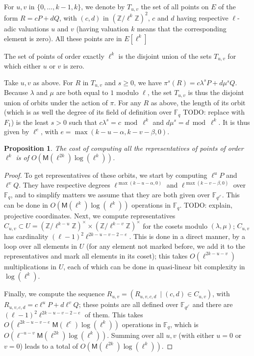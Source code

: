 \documentclass{lms}
\newcommand{\todo}[1]{{\color{red}TODO: #1}}
\newtheorem{prop}[thm]{Proposition}
\newcommand{\M}{\mathsf{M}}
\newcommand{\Z}{\mathbb{Z}}
\newcommand{\F}{\mathbb{F}}
\begin{document}
\begin{defi}
For $u,v$ in $\{0,\dots,k-1,k\}$, we denote by $T_{u,v}$ the set
of all points on $E$ of the form $R=c P + d Q$, with $(c,d)$ in
$(\Z/\ell^k\Z)^2$, $c$ and $d$ having respective $\ell$-adic
valuations $u$ and $v$ (having valuation $k$ means that the
corresponding element is zero). All these points are in $E[\ell^k]$
\end{defi}

The set of points of order exactly $\ell^k$ is the disjoint union of
the sets $T_{u,v}$ for which either $u$ or $v$ is zero.

Take $u,v$ as above. For $R$ in $T_{u,v}$ and $s \ge 0$, we have
$\pi^s(R) = c\lambda^s P+ d \mu^s Q$.  Because $\lambda$ and $\mu$ are
both equal to $1$ modulo $\ell$, the set $T_{u,v}$ is thus the
disjoint union of orbits under the action of $\pi$. For any $R$ as
above, the length of its orbit (which is as well the degree of its
field of definition over $\F_q$ \todo{replace with $F_1$}) is the least $s>0$ such that $c
\lambda^s = c \bmod \ell^k$ and $d \mu^s =d \bmod \ell^k$. It is thus
given by $\ell^e$, with $e={\max(k-u-\alpha, k-v-\beta, 0)}$. %

\begin{prop} \label{prop:cout-repre}
The cost of computing all the representatives of points of order $\ell^k$ is of $O(\M(\ell^{2k})\log(\ell^k))$.
\end{prop}

\begin{proof}
To get representatives of these orbits, we start by computing
$\ell^uP$ and $\ell^vQ$. They have respective degrees
$\ell^{\max(k-u-\alpha, 0)}$ and $\ell^{\max(k-v-\beta, 0)}$ over
$\F_q$, and to simplify matters we assume that they are both given
over $\F_{q^{\ell^e}}$. This can be done in $O( \M(\ell^k)
\log(\ell^k))$ operations in $\F_q$. \todo{explain, projective
  coordinates}. Next, we compute representatives $C_{u,v} \subset
U=(\Z/\ell^{k-u}\Z)^{\times} \times (\Z/\ell^{k-v}\Z)^{\times}$ for the cosets
modulo $(\lambda, \mu)$; $C_{u,v}$ has cardinality $(\ell-1)^2
\ell^{2k-u-v-2-e}$. This is done in a direct manner, by a loop over
all elements in $U$ (for any element not marked before, we add it to
the representatives and mark all elements in its coset); this takes
$O(\ell^{2k-u-v})$ multiplications  in $U$, each of which can be
done in quasi-linear bit complexity in $\log(\ell^k)$.

Finally, we compute the sequence $R_{u,v}=(R_{u,v,c,d}\ \mid (c,d) \in
C_{u,v})$, with $R_{u,v,c,d}=c \ell^u P + d \ell^v Q$; these points
are all defined over $\F_{q^{\ell^e}}$ and there are $(\ell-1)^2
\ell^{2k-u-v-2-e}$ of them. This takes $O(\ell^{2k-u-v-e}
\M(\ell^e)\log(\ell^k))$ operations in $\F_q$, which is $O(\ell^{-u-v}
\M(\ell^{2k})\log(\ell^k))$. Summing over all $u,v$ 
(with either $u=0$ or $v=0$) leads to a total
of $O(\M(\ell^{2k})\log(\ell^k))$.

\end{proof}
\end{document}
